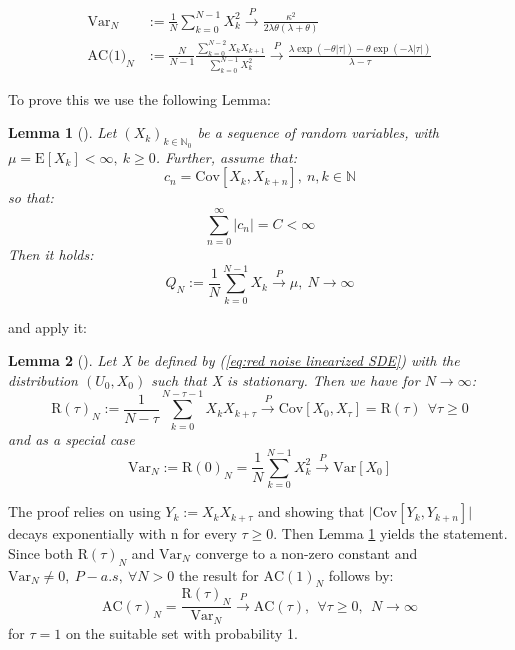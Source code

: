 \documentclass[%
thesis=student,%
coverpage=false,%
titlepage=false,%
headmarks=true, %
english,%
font=libertine, %
math=newpxtx, %
BCOR=5mm,%
coverBCOR=11mm%
]{tumbook}
\newtheorem{lemma}{Lemma}
\begin{document}
\begin{subequations}
        \begin{align*}
            \text{Var}_{N} &:= \frac{1}{N}\sum_{k=0}^{N-1}X_{k}^{2} \xrightarrow{P} \frac{\kappa^{2}}{2\lambda\theta(\lambda + \theta)} \\
            \text{AC(1)}_{N} &:= \frac{N}{N-1}\frac{\sum_{k=0}^{N-2}X_{k}X_{k+1}}{\sum_{k=0}^{N-1}X_{k}^{2}} \xrightarrow{P} \frac{\lambda\exp(-\theta\lvert\tau\rvert) - \theta\exp(-\lambda\lvert\tau\rvert)}{\lambda - \tau}
        \end{align*}
\end{subequations}

To prove this we use the following Lemma:

\begin{lemma}[\cite{Morr:2024SM}]
    Let $(X_{k})_{k\in \mathbb{N}_{0}}$ be a sequence of random variables, with $\mu = \mathrm{E}[X_{k}] < \infty, \ k \geq 0$. Further, assume that: 
    \[
    c_{n} = \mathrm{Cov}[X_{k},X_{k+n}], \ n, k \in \mathbb{N}
    \]
    so that:
    \[
    \sum_{n=0}^{\infty}\lvert c_{n} \rvert = C < \infty
    \]
    Then it holds:
    \[
    Q_{N} := \frac{1}{N}\sum_{k=0}^{N-1}X_{k} \xrightarrow{P} \mu, \ N \rightarrow \infty
    \]
    \label{lemma:summable covariance}
\end{lemma}

and apply it:

\begin{lemma}[\cite{Morr:2024SM}]
    Let X be defined by (\ref{eq:red noise linearized SDE}) with the distribution $(U_{0},X_{0})$ such that X is stationary. Then we have for $N \rightarrow \infty$:
    \[
    \mathrm{R}(\tau)_{N} := \frac{1}{N-\tau} \sum_{k=0}^{N-\tau -1} X_{k}X_{k+\tau} \xrightarrow{P} \mathrm{Cov}[X_{0},X_{\tau}] = \mathrm{R}(\tau) \ \ \forall \tau \geq 0
    \]
    and as a special case
    \[
    \mathrm{Var}_{N} := \mathrm{R}(0)_{N} = \frac{1}{N} \sum_{k=0}^{N-1} X_{k}^{2} \xrightarrow{P} \mathrm{Var}[X_{0}]
    \]
    \label{lemma: consistent estimator proof}
\end{lemma}

The proof relies on using $Y_{k} := X_{k}X_{k+\tau}$ and showing that $\lvert \mathrm{Cov}[Y_{k},Y_{k+n}] \rvert$ decays exponentially with n for every $\tau \geq 0$. Then Lemma \ref{lemma:summable covariance} yields the statement. Since both $\mathrm{R}(\tau)_{N}$ and $\mathrm{Var}_{N}$ converge to a non-zero constant and $\mathrm{Var}_N \neq 0, \ P-a.s, \ \forall N > 0$ the result for $\mathrm{AC}(1)_{N}$ follows by:
\[
\mathrm{AC}(\tau)_N = \frac{\mathrm{R}(\tau)_{N}}{\mathrm{Var}_{N}} \xrightarrow{P} \mathrm{AC}(\tau), \ \ \forall \tau \geq 0, \ \ N \rightarrow \infty
\]
for $\tau = 1$ on the suitable set with probability 1.
\end{document}
